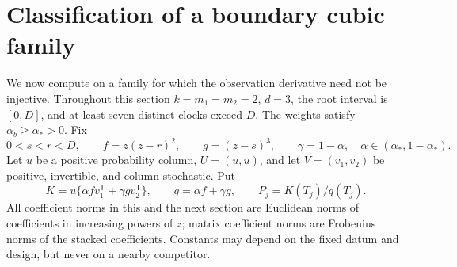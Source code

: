 \section{Classification of a boundary cubic family}
\label{sec:cubic-classification-v95}
We now compute on a family for which the observation derivative need not
be injective. Throughout this section $k=m_1=m_2=2$, $d=3$, the root
interval is $[0,D]$, and at least seven distinct clocks exceed $D$.
The weights satisfy $\alpha_b\ge\alpha_*>0$. Fix
\begin{equation}\label{eq:family-v95}
 0<s<r<D,\qquad f=z(z-r)^2,\qquad g=(z-s)^3,
 \qquad \gamma=1-\alpha,\quad \alpha\in(\alpha_*,1-\alpha_*).
\end{equation}
Let $u$ be a positive probability column, $U=(u,u)$, and let
$V=(v_1,v_2)$ be positive, invertible, and column stochastic. Put
\[
 K=u\{\alpha f v_1^{\mathsf T}+\gamma g v_2^{\mathsf T}\},\qquad
 q=\alpha f+\gamma g,\qquad P_j=K(T_j)/q(T_j).
\]
All coefficient norms in this and the next section are Euclidean norms
of coefficients in increasing powers of $z$; matrix coefficient norms
are Frobenius norms of the stacked coefficients. Constants may depend
on the fixed datum and design, but never on a nearby competitor.


